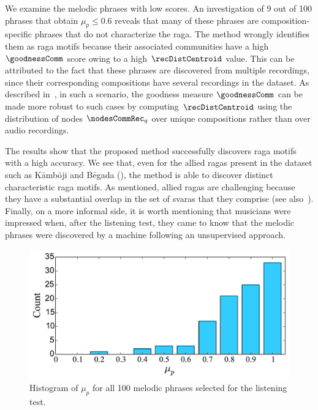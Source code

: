 {We examine the melodic phrases with low scores. An investigation of 9 out of 100 phrases that obtain $\mu_p\leq0.6$ reveals that many of these phrases are composition-specific phrases that do not characterize the \gls{raga}. The method wrongly identifies them as \gls{raga} motifs because their associated communities have a high $\goodnessComm$ score owing to a high $\recDistCentroid$ value. This can be attributed to the fact that these phrases are discovered from multiple recordings, since their corresponding compositions have several recordings in the dataset.  As described in~, in such a scenario, the goodness measure $\goodnessComm$ can be made more robust to such cases by computing $\recDistCentroid$ using the distribution of nodes ${\boldsymbol{\nodesCommRec}_q}$ over unique compositions rather than over audio recordings.

The results show that the proposed method successfully discovers \gls{raga} motifs with a high accuracy. We see that, even for the allied \glspl{raga} present in the dataset such as K\={a}mb\={o}ji and B\={e}gada (), the method is able to discover distinct characteristic \gls{raga} motifs. As mentioned, allied \glspl{raga} are challenging because they have a substantial overlap in the set of svaras that they comprise (see also~). Finally, on a more informal side, it is worth mentioning that musicians were impressed when, after the listening test, they came to know that the melodic phrases were discovered by a machine following an unsupervised approach. 


\begin{figure}
	\begin{center}
		\includegraphics[width=\figSizeEighty]{ch06_patterns/figures/Characterization/histogram_musician_rating.pdf}
	\end{center}
	\caption{Histogram of $\mu_p$ for all 100 melodic phrases selected for the listening test.}
	\label{fig:average_rating_histogram_pattern_characterization}
\end{figure}


}
